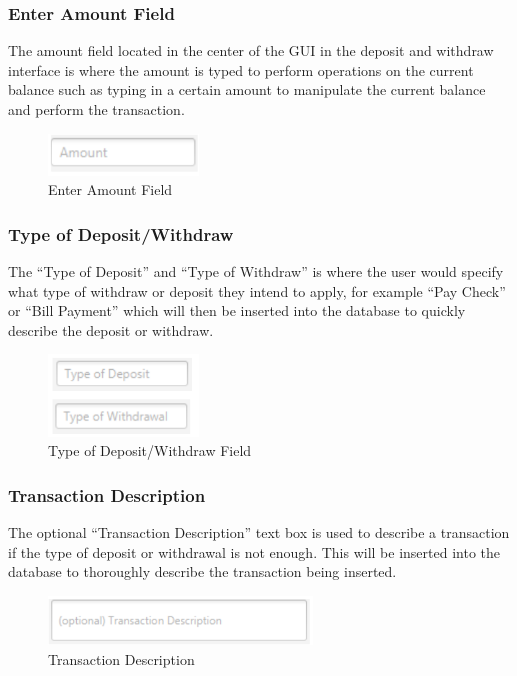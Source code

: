 \documentclass[12pt]{article}
\begin{document}
\subsubsection{Enter Amount Field}
The amount field located in the center of the GUI in the deposit and withdraw interface is where the amount is typed to perform operations on the current balance such as typing in a certain amount to manipulate the current balance and perform the transaction.

\begin{figure}[h!]
  \centering
  \includegraphics[width=40mm]{amount.PNG}
  \caption{Enter Amount Field}
\end{figure}

\subsubsection{Type of Deposit/Withdraw}
The “Type of Deposit” and “Type of Withdraw” is where the user would specify what type of withdraw or deposit they intend to apply, for example “Pay Check” or “Bill Payment” which will then be inserted into the database to quickly describe the deposit or withdraw.

\begin{figure}[h!]
  \centering
  \includegraphics[width=40mm]{typewd.PNG}
  \caption{Type of Deposit/Withdraw Field}
\end{figure}

\subsubsection{Transaction Description}
The optional “Transaction Description” text box is used to describe a transaction if the type of deposit or withdrawal is not enough. This will be inserted into the database to thoroughly describe the transaction being inserted.

\begin{figure}[h!]
  \centering
  \includegraphics[width=70mm]{transdescrib.PNG}
  \caption{Transaction Description}
\end{figure}
\end{document}
